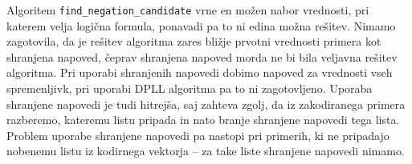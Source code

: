 \documentclass[12pt,a4paper,twoside]{article}
\theoremstyle{definition} %
\theoremstyle{plain} %
\numberwithin{equation}{section}  %
\begin{document}
Algoritem \texttt{find\_\-negation\_\-candidate} vrne en možen nabor vrednosti, pri katerem velja logična formula, ponavadi pa to ni edina možna rešitev.
Nimamo zagotovila, da je rešitev algoritma zares bližje prvotni vrednosti primera kot shranjena napoved, čeprav shranjena napoved morda ne bi bila veljavna rešitev algoritma.
Pri uporabi shranjenih napovedi dobimo napoved za vrednosti vseh spremenljivk, pri uporabi DPLL algoritma pa to ni zagotovljeno.
Uporaba shranjene napovedi je tudi hitrejša, saj zahteva zgolj, da iz zakodiranega primera razberemo, kateremu listu pripada in nato branje shranjene napovedi tega lista.
Problem uporabe shranjene napovedi pa nastopi pri primerih, ki ne pripadajo nobenemu listu iz kodirnega vektorja -- za take liste shranjene napovedi nimamo.

\end{document}
